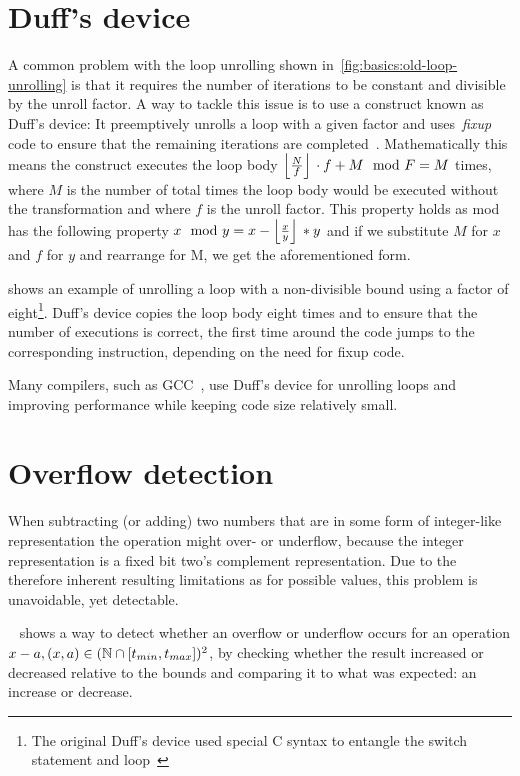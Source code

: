 

\section{Duff's device}\label{sec:basics:duffs}

A common problem with the loop unrolling shown in~\cref{fig:basics:old-loop-unrolling} is that it requires the number of iterations to be constant and divisible by the unroll factor.
A way to tackle this issue is to use a construct known as Duff's device: It preemptively unrolls a loop with a given factor and uses~\textit{fixup} code to ensure that the remaining iterations are completed~\cite{duff_1983}.
Mathematically this means the construct executes the loop body $\left\lfloor{}\frac{N}{f}\right\rfloor{} \cdot f + M \mod F = M$ times, where $M$ is the number of total times the loop body would be executed without the transformation and where $f$ is the unroll factor.
This property holds as mod has the following property $x \mod y = x - \left\lfloor{}\frac{x}{y}\right\rfloor{} * y$ and if we substitute $M$ for $x$ and $f$ for $y$ and rearrange for M, we get the aforementioned form.

 shows an example of unrolling a loop with a non-divisible bound using a factor of eight\footnote{The original Duff's device used special C syntax to entangle the switch statement and loop~\cite{duff_1983}}.
Duff's device copies the loop body eight times and to ensure that the number of executions is correct, the first time around the code jumps to the corresponding instruction, depending on the need for fixup code.

Many compilers, such as GCC~\cite{gcc}, use Duff's device for unrolling loops and improving performance while keeping code size relatively small.



\section{Overflow detection}\label{sec:basics:overflow}

When subtracting (or adding) two numbers that are in some form of integer-like representation the operation might over- or underflow, because the integer representation is a fixed bit two's complement representation.
Due to the therefore inherent resulting limitations as for possible values, this problem is unavoidable, yet detectable.

~\cite{pmg_2009} shows a way to detect whether an overflow or underflow occurs for an operation $x - a, (x, a) \in (\mathbb{N} \cap {\lbrack t_{min}, t_{max} \rbrack})^2$, by checking whether the result increased or decreased relative to the bounds and comparing it to what was expected: an increase or decrease.


